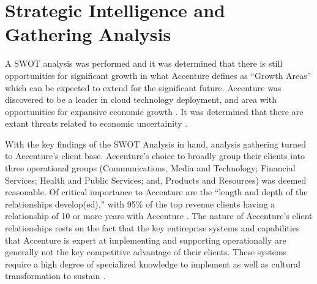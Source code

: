 \section{Strategic Intelligence and Gathering Analysis}

A SWOT analysis was performed \parencite{wagleSWOTAnalysisAccenture2020} and it was determined that there is still opportunities for significant growth in what Accenture defines as ``Growth Areas'' \parencite{AccenturePLC2019, marutaForeignAidInstitutional2020} which can be expected to extend for the significant future. Accenture was discovered to be a leader in cloud technology deployment, and area with opportunities for expansive economic growth \parencite{asaduzzamanGeospatialCyberinfrastructureRegional2020}. It was determined that there are extant threats related to economic uncertainity \parencite{siuChinaBeltRoad2019}.

With the key findings of the SWOT Analysis in hand, analysis gathering turned to Accenture's client base. Accenture's choice to broadly group their clients into three operational groups (Communications, Media and Technology; Financial Services; Health and Public Services; and, Products and Resources) was deemed reasonable. Of critical importance to Accenture are the ``length and depth of the relationships develop(ed),'' with 95\% of the top revenue clients having a relationship of 10 or more years with Accenture \parencite{wagleClientAnalysisAccenture2020}. The nature of Accenture's client relationships rests on the fact that the key entireprise systems and capabilities that Accenture is expert at implementing and supporting operationally are generally not the key competitive advantage of their clients. These systems require a high degree of specialized knowledge to implement as well as cultural transformation to sustain \parencite{aboabdoImplementingEnterpriseResource2019,kimpelMeasuringImpactCulture2020}.
